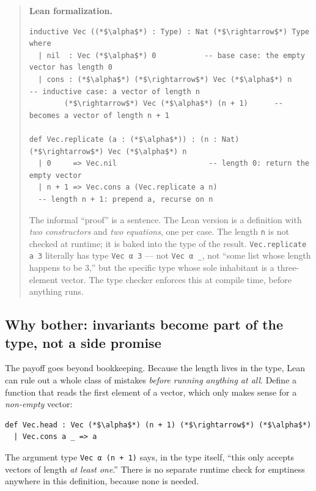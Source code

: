 \begin{quote}
\textbf{Lean formalization.}

\begin{lstlisting}
inductive Vec ((*$\alpha$*) : Type) : Nat (*$\rightarrow$*) Type where
  | nil  : Vec (*$\alpha$*) 0           -- base case: the empty vector has length 0
  | cons : (*$\alpha$*) (*$\rightarrow$*) Vec (*$\alpha$*) n       -- inductive case: a vector of length n
        (*$\rightarrow$*) Vec (*$\alpha$*) (n + 1)      -- becomes a vector of length n + 1

def Vec.replicate (a : (*$\alpha$*)) : (n : Nat) (*$\rightarrow$*) Vec (*$\alpha$*) n
  | 0     => Vec.nil                     -- length 0: return the empty vector
  | n + 1 => Vec.cons a (Vec.replicate a n)
  -- length n + 1: prepend a, recurse on n
\end{lstlisting}

The informal ``proof'' is a sentence. The Lean version is a definition with \emph{two constructors} and \emph{two equations}, one per case. The length \texttt{n} is not checked at runtime; it is baked into the type of the result. \texttt{Vec.replicate a 3} literally has type \texttt{Vec α 3} --- not \texttt{Vec α \_\allowbreak{}}, not ``some list whose length happens to be 3,'' but the specific type whose sole inhabitant is a three-element vector. The type checker enforces this at compile time, before anything runs.
\end{quote}

\subsection{Why bother: invariants become part of the type, not a side promise}\label{sec:01-basics:03-dependent-types:6}

The payoff goes beyond bookkeeping. Because the length lives in the type, Lean can rule out a whole class of mistakes \emph{before running anything at all}. Define a function that reads the first element of a vector, which only makes sense for a \emph{non-empty} vector:

\begin{lstlisting}
def Vec.head : Vec (*$\alpha$*) (n + 1) (*$\rightarrow$*) (*$\alpha$*)
  | Vec.cons a _ => a
\end{lstlisting}

The argument type \texttt{Vec α (n + 1)} says, in the type itself, ``this only accepts vectors of length \emph{at least one}.'' There is no separate runtime check for emptiness anywhere in this definition, because none is needed.

